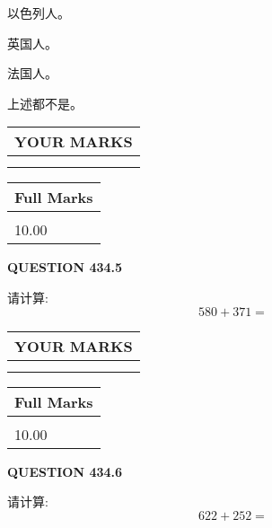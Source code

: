 \documentclass{ctexart}
\begin{document}
 
以色列人。
 
 
英国人。
 
 
法国人。
 
 
 上述都不是。
 
 
  
\vspace{0.2in}
  
\noindent\begin{tabular}{|l|}
\hline
 YOUR MARKS  \\
\hline
 \\ 
 \\ 
\hline
\end{tabular}
\hspace{0.05in} \begin{tabular}{|l|}
\hline
 Full Marks  \\
\hline
 \\ 
10.00 \\
\hline
\end{tabular}
{\textbf{\Large{QUESTION
434.5 
}}}
  
  
 
请计算:
\begin{equation}
580 +  %
371 = \nonumber
\end{equation}
 

 

 
  
\vspace{0.2in}
  
\noindent\begin{tabular}{|l|}
\hline
 YOUR MARKS  \\
\hline
 \\ 
 \\ 
\hline
\end{tabular}
\hspace{0.05in} \begin{tabular}{|l|}
\hline
 Full Marks  \\
\hline
 \\ 
10.00 \\
\hline
\end{tabular}
{\textbf{\Large{QUESTION
434.6 
}}}
  
  
 
请计算:
\begin{equation}
622 +  %
252 = \nonumber
\end{equation}
 
\end{document}
